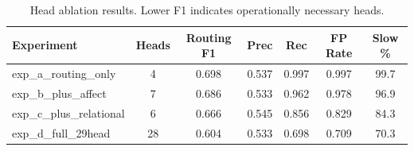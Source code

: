 \begin{table}[h]
\centering
\begin{tabular}{lcccccc}
\toprule
Experiment & Heads & Routing F1 & Prec & Rec & FP Rate & Slow \% \\
\midrule
exp\_a\_routing\_only & 4 & 0.698 & 0.537 & 0.997 & 0.997 & 99.7 \\
exp\_b\_plus\_affect & 7 & 0.686 & 0.533 & 0.962 & 0.978 & 96.9 \\
exp\_c\_plus\_relational & 6 & 0.666 & 0.545 & 0.856 & 0.829 & 84.3 \\
exp\_d\_full\_29head & 28 & 0.604 & 0.533 & 0.698 & 0.709 & 70.3 \\
\bottomrule
\end{tabular}
\caption{Head ablation results. Lower F1 indicates operationally necessary heads.}
\label{tab:ablation}
\end{table}
